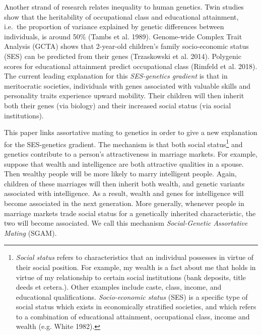 \documentclass[
]{article}
\begin{document}
Another strand of research relates inequality to human genetics. Twin
studies show that the heritability of occupational class and educational
attainment, i.e.~the proportion of variance explained by genetic
differences between individuals, is around 50\% (Tambs et al. 1989).
Genome-wide Complex Trait Analysis (GCTA) shows that 2-year-old
children's family socio-economic status (SES) can be predicted from
their genes (Trzaskowski et al. 2014). Polygenic scores for educational
attainment predict occupational class (Rimfeld et al. 2018). The current
leading explanation for this \emph{SES-genetics gradient} is that in
meritocratic societies, individuals with genes associated with valuable
skills and personality traits experience upward mobility. Their children
will then inherit both their genes (via biology) and their increased
social status (via social institutions).

This paper links assortative mating to genetics in order to give a new
explanation for the SES-genetics gradient. The mechanism is that both
social status\footnote{\emph{Social status} refers to characteristics that an individual
  possesses in virtue of their social position. For example, my wealth
  is a fact about me that holds in virtue of my relationship to
  certain social institutions (bank deposits, title deeds et cetera.).
  Other examples include caste, class, income, and educational
  qualifications. \emph{Socio-economic status} (SES) is a specific type of
  social status which exists in economically stratified societies, and
  which refers to a combination of educational attainment,
  occupational class, income and wealth (e.g. White 1982).} and genetics contribute to a person's attractiveness
in marriage markets. For example, suppose that wealth and intelligence
are both attractive qualities in a spouse. Then wealthy people will be
more likely to marry intelligent people. Again, children of these
marriages will then inherit both wealth, and genetic variants associated
with intelligence. As a result, wealth and genes for intelligence will
become associated in the next generation. More generally, whenever
people in marriage markets trade social status for a genetically
inherited characteristic, the two will become associated. We call this
mechanism \emph{Social-Genetic Assortative Mating} (SGAM).
\end{document}
